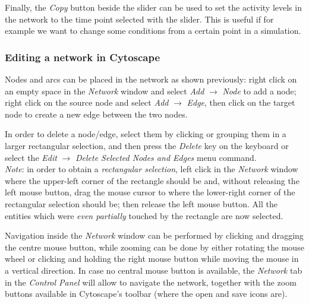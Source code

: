 \documentclass{article}
\begin{document}
Finally, the \emph{Copy} button beside the slider can be used to set the activity levels in the network to the time point
selected with the slider. This is useful if for example we want to change some conditions from a certain point in a simulation.



\subsubsection{Editing a network in Cytoscape}
Nodes and arcs can be placed in the network as shown previously: right click on an empty space
in the \emph{Network} window and select \emph{Add} $\rightarrow$ \emph{Node} to add a node;
right click on the source node and select \emph{Add} $\rightarrow$ \emph{Edge}, then click on
the target node to create a new edge between the two nodes.

In order to delete a node/edge, select them by clicking
or grouping them in a larger rectangular selection, and then press the \emph{Delete} key on the keyboard
or select the \emph{Edit} $\rightarrow$ \emph{Delete Selected Nodes and Edges} menu command.\\
\emph{Note}: in order to obtain a \emph{rectangular selection}\label{nota:rectangular-selection},
left click in the \emph{Network} window where the upper-left corner of the rectangle should be and,
without releasing the left mouse button, drag the mouse cursor to where the lower-right corner of the
rectangular selection should be; then release the left mouse button. All the entities which were
\emph{even partially} touched by the rectangle are now selected.

Navigation inside the \emph{Network} window can be performed by clicking and dragging the centre mouse button,
while zooming can be done by either rotating the mouse wheel or clicking and holding the right mouse button
while moving the mouse in a vertical direction. In case no central mouse button is available, the \emph{Network}
tab in the \emph{Control Panel} will allow to navigate the network, together with the zoom buttons available in
Cytoscape's toolbar (where the open and save icons are).
\end{document}
